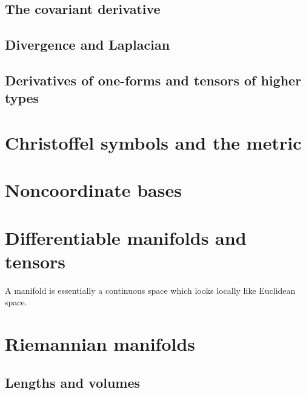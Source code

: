 \documentclass[12pt,a4paper]{article}
\begin{document}
\subsection{The covariant derivative}





\subsection{Divergence and Laplacian}





\subsection{Derivatives of one-forms and tensors of higher types}






\section{Christoffel symbols and the metric}










\section{Noncoordinate bases}








\section{Differentiable manifolds and tensors}
A manifold is essentially a continuous space which looks locally like Euclidean space.






\section{Riemannian manifolds}







\subsection{Lengths and volumes}
\end{document}
